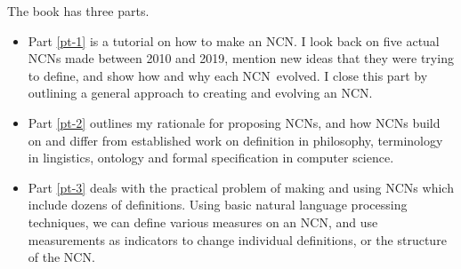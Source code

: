 \documentclass[graybox,envcountchap,sectrefs]{svmono}
\newcommand{\ncn}{NCN}
\begin{document}
The book has three parts.
\begin{itemize}
  \item Part \ref{pt-1} is a tutorial on how to make an \ncn. I look back on five actual \ncn s made between 2010 and 2019, mention new ideas that they were trying to define, and show how and why each \ncn\ evolved. I close this part by outlining a general approach to creating and evolving an \ncn.
  \item Part \ref{pt-2} outlines my rationale for proposing \ncn s, and how \ncn s build on and differ from established work on definition in philosophy, terminology in lingistics, ontology and formal specification in computer science.
  \item Part \ref{pt-3} deals with the practical problem of making and using \ncn s which include dozens of definitions. Using basic natural language processing techniques, we can define various measures on an \ncn, and use measurements as indicators to change individual definitions, or the structure of the \ncn. 
\end{itemize}





\end{document}
